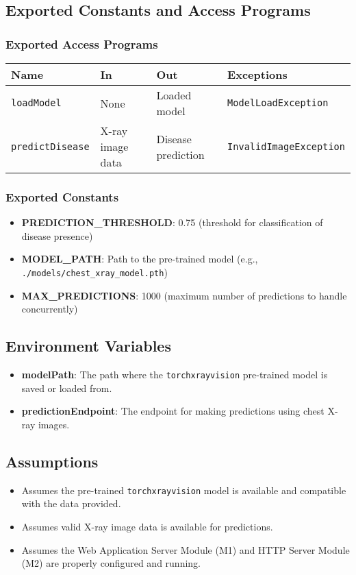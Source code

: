 \documentclass[12pt, titlepage]{article}
\begin{document}
\subsection{Exported Constants and Access Programs}
\subsubsection{Exported Access Programs}
\begin{tabular}{|l|l|l|l|}
    \hline
    \textbf{Name} & \textbf{In} & \textbf{Out} & \textbf{Exceptions} \\
    \hline
    \texttt{loadModel} & None & Loaded model & \texttt{ModelLoadException} \\
    \texttt{predictDisease} & X-ray image data & Disease prediction & \texttt{InvalidImageException} \\
    \hline
\end{tabular}

\subsubsection{Exported Constants}
\begin{itemize}
    \item \textbf{PREDICTION\_THRESHOLD}: 0.75 (threshold for classification of disease presence)
    \item \textbf{MODEL\_PATH}: Path to the pre-trained model (e.g., \texttt{./models/chest\_xray\_model.pth})
    \item \textbf{MAX\_PREDICTIONS}: 1000 (maximum number of predictions to handle concurrently)
\end{itemize}

\subsection{Environment Variables}
\begin{itemize}
    \item \textbf{modelPath}: The path where the \texttt{torchxrayvision} pre-trained model is saved or loaded from.
    \item \textbf{predictionEndpoint}: The endpoint for making predictions using chest X-ray images.
\end{itemize}

\subsection{Assumptions}
\begin{itemize}
    \item Assumes the pre-trained \texttt{torchxrayvision} model is available and compatible with the data provided.
    \item Assumes valid X-ray image data is available for predictions.
    \item Assumes the Web Application Server Module (M1) and HTTP Server Module (M2) are properly configured and running.
\end{itemize}
\end{document}
